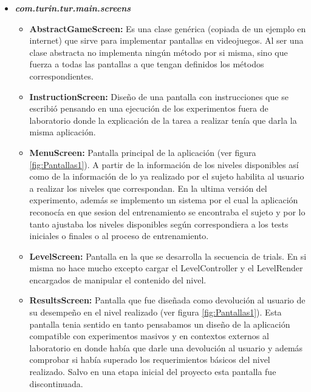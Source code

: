 \documentclass{article}
\begin{document}
    \begin{itemize}
        \item \textit{\textbf{com.turin.tur.main.screens}}
        \begin{itemize}
            \item \textbf{AbstractGameScreen:} Es una clase genérica (copiada de un ejemplo en internet) que sirve para implementar pantallas en videojuegos. Al ser una clase abstracta no implementa ningún método por si misma, sino que fuerza a todas las pantallas a que tengan definidos los métodos correspondientes. 
            \item \textbf{InstructionScreen:} Diseño de una pantalla con instrucciones que se escribió pensando en una ejecución de los experimentos fuera de laboratorio donde la explicación de la tarea a realizar tenía que darla la misma aplicación.
            \item \textbf{MenuScreen:} Pantalla principal de la aplicación (ver figura \ref{fig:Pantallas1}). A partir de la información de los niveles disponibles así como de la información de lo ya realizado por el sujeto habilita al usuario a realizar los niveles que correspondan. En la ultima versión del experimento, además se implemento un sistema por el cual la aplicación reconocía en que sesion del entrenamiento se encontraba el sujeto y por lo tanto ajustaba los niveles disponibles según correspondiera a los tests iniciales o finales o al proceso de entrenamiento. 
            \item \textbf{LevelScreen:} Pantalla en la que se desarrolla la secuencia de trials. En si misma no hace mucho excepto cargar el LevelController y el LevelRender encargados de manipular el contenido del nivel. 
            \item \textbf{ResultsScreen:} Pantalla que fue diseñada como devolución al usuario de su desempeño en el nivel realizado (ver figura \ref{fig:Pantallas1}). Esta pantalla tenia sentido en tanto pensabamos un diseño de la aplicación compatible con experimentos masivos y en contextos externos al laboratorio en donde había que darle una devolución al usuario y además comprobar si había superado los requerimientos básicos del nivel realizado. Salvo en una etapa inicial del proyecto esta pantalla fue discontinuada. 
        \end{itemize}
        

\end{itemize}
\end{document}
